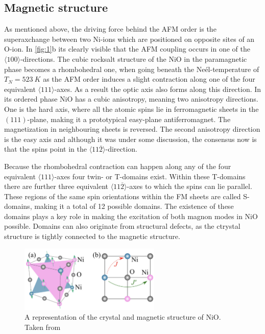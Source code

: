 \subsection{Magnetic structure}
As mentioned above, the driving force behind the AFM order is the superaxchange between two Ni-ions which are positioned on opposite sites of an O-ion.
In \autoref{fig:1}b its clearly visible that the AFM coupling occurs in one of the $\langle100\rangle$-directions.
The cubic rocksalt structure of the NiO in the paramagnetic phase becomes a rhombohedral one, when going beneath the Neél-temperature of $T_N = \qty{523}{K}$ as the AFM order induces a slight contraction along one of the four equivalent $\langle111\rangle$-axes.
As a result the optic axis also forms along this direction.
In its ordered phase NiO has a cubic anisotropy, meaning two anisotropy directions.
One is the hard axis, where all the atomic spins lie in ferromagnetic sheets in the $(111)$-plane, making it a prototypical easy-plane antiferromagnet.
The magnetization in neighbouring sheets is reversed.
The second anisotropy direction is the easy axis and although it was under some discussion, the consensus now is  that the spins point in the $\langle11\overline{2}\rangle$-direction.

Because the rhombohedral contraction can happen along any of the four equivalent $\langle111\rangle$-axes four twin- or T-domains exist.
Within these T-domains there are further three equivalent $\langle11\overline{2}\rangle$-axes to which the spins can lie parallel.
These regions of the same spin orientations within the FM sheets are called S-domains, making it a total of 12 possible domains.
The existence of these domains plays a key role in making the excitation of both magnon modes in NiO possible.
Domains can also originate from structural defects, as the ctrystal structure is tightly connected to the magnetic structure.
\begin{figure}[ht]
    \centering
    \includegraphics[width=0.6\textwidth]{pictures/1.png}
    \caption{A representation of the crystal and magnetic structure of NiO. Taken from }
    \label{fig:1}
\end{figure}
\FloatBarrier

